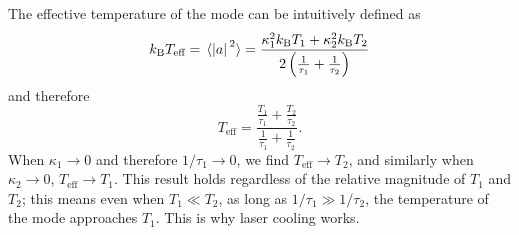 \documentclass[hyperref, a4paper]{article}
\newcommand*{\kB}{k_{\text{B}}}
\begin{document}
The effective temperature of the mode can be intuitively defined as 
\begin{equation}
    \kB T_{\text{eff}} = \expval*{\abs*{a}^2} = \frac{\kappa_1^2 \kB T_1 + \kappa_2^2 \kB T_2}{2 \left( \frac{1}{\tau_1} + \frac{1}{\tau_2} \right)}
\end{equation}
and therefore 
\begin{equation}
    T_{\text{eff}} = \frac{\frac{T_1}{\tau_1} + \frac{T_2}{\tau_2}}{\frac{1}{\tau_1} + \frac{1}{\tau_2}}.
\end{equation}
When $\kappa_1 \to 0$ and therefore $1/\tau_1 \to 0$, we find $T_{\text{eff}} \to T_2$,
and similarly when $\kappa_2 \to 0$, $T_{\text{eff}} \to T_1$.
This result holds regardless of the relative magnitude of $T_1$ and $T_2$;
this means even when $T_1 \ll T_2$, as long as $1/\tau_1 \gg 1/\tau_2$,
the temperature of the mode approaches $T_1$.
This is why laser cooling works. 
\end{document}
